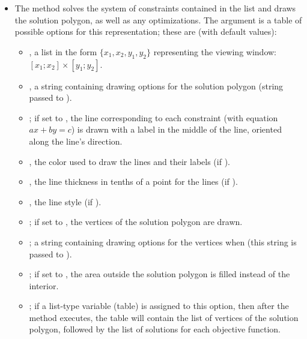 \begin{itemize}
    \item The method  solves the system of constraints contained in the list  and draws the solution polygon, as well as any optimizations. The  argument is a table of possible options for this representation; these are (with default values):
    \begin{itemize}
        \item {}, a list in the form $\{x_1,x_2,y_1,y_2\}$ representing the viewing window: $[x_1;x_2]\times[y_1;y_2]$. 

        \item {}, a string containing drawing options for the solution polygon (string passed to \drawcmd). 

        \item {}; if set to \true, the line corresponding to each constraint (with equation $ax+by=c$) is drawn with a label in the middle of the line, oriented along the line's direction. 

        \item {}, the color used to draw the lines and their labels (if ). 

        \item {}, the line thickness in tenths of a point for the lines (if ). 

        \item {}, the line style (if ).

        \item {}; if set to \true, the vertices of the solution polygon are drawn. 

        \item {}; a string containing drawing options for the vertices when  (this string is passed to \drawcmd). 

        \item {}; if set to \true, the area outside the solution polygon is filled instead of the interior. 

        \item {}; if a list-type variable (table) is assigned to this option, then after the method executes, the table will contain the list of vertices of the solution polygon, followed by the list of solutions for each objective function. 


\end{itemize}
\end{itemize}
